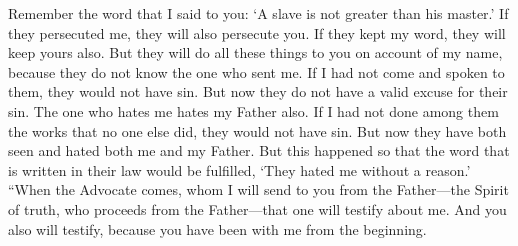 \begin{biblechapter}
\verse Remember the word that I said to you: ‘A slave is not greater than his master.’ If they persecuted me, they will also persecute you. If they kept my word, they will keep yours also.
\verse But they will do all these things to you on account of my name, because they do not know the one who sent me.
\verse If I had not come and spoken to them, they would not have sin. But now they do not have a valid excuse for their sin.
\verse The one who hates me hates my Father also.
\verse If I had not done among them the works that no one else did, they would not have sin. But now they have both seen and hated both me and my Father.
\verse But this happened so that the word that is written in their law would be fulfilled, ‘They hated me without a reason.’
\verse “When the Advocate comes, whom I will send to you from the Father—the Spirit of truth, who proceeds from the Father—that one will testify about me.
\verse And you also will testify, because you have been with me from the beginning.
\end{biblechapter}

